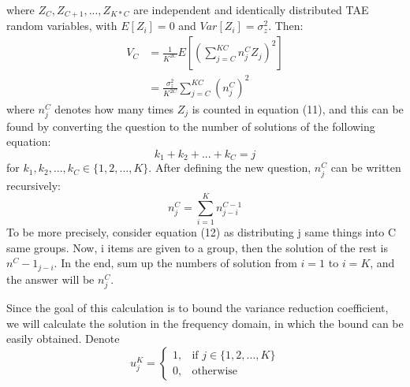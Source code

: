 where \begin{math}Z_C,Z_{C+1},...,Z_{K*C}\end{math} are independent and identically distributed TAE random variables, with \begin{math}E[Z_{i}]=0\end{math} and \begin{math}Var[Z_{i}]=\sigma^2_z\end{math}. Then:
\[
\begin{aligned}
V_C &=\frac{1}{K^{2C}}E[(\sum^{KC}_{j=C}n^C_{j}Z_{j})^{2}]\\
    &=\frac{\sigma^2_z}{K^{2C}}\sum^{KC}_{j=C}(n^C_{j})^2
\end{aligned}
\]
where \begin{math}n^C_{j}\end{math} denotes how many times \begin{math}Z_{j}\end{math} is counted in equation (11), and this can be found by converting the question to the number of solutions of the following equation:
\begin{equation}
k_{1}+k_{2}+...+k_{C}=j
\end{equation}
for \begin{math}k_{1},k_{2},...,k_{C}\in\{1,2,...,K\}\end{math}. After defining the new question,  \begin{math}n^C_{j}\end{math} can be written recursively:
\[
n^C_{j}=\sum^K_{i=1}n^{C-1}_{j-i}
\]
To be more precisely, consider equation (12) as distributing j same things into C same groups. Now, i items are given to a group, then the solution of the rest is \begin{math}n^C-1_{j-i}\end{math}. In the end, sum up the numbers of solution from \begin{math}i=1\end{math} to \begin{math}i=K\end{math}, and the answer will be \begin{math}n^C_{j}\end{math}.
\par Since the goal of this calculation is to bound the variance reduction coefficient, we will calculate the solution in the frequency domain, in which the bound can be easily obtained. Denote
\[
u^K_{j}=
\begin{cases}
    1,& \text{if } j\in\{1,2,...,K\}\\
    0,& \text{otherwise}
\end{cases}
\]
